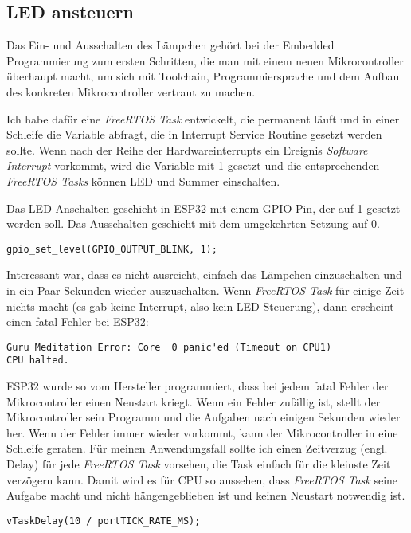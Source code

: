 \subsection{LED ansteuern}
\label{sec:main:led}
Das Ein- und Ausschalten des Lämpchen gehört bei der Embedded Programmierung zum ersten Schritten, die man mit einem neuen Mikrocontroller überhaupt macht, um sich mit Toolchain, Programmiersprache und dem Aufbau des konkreten Mikrocontroller vertraut zu machen. 

Ich habe dafür eine \textit{FreeRTOS Task} entwickelt, die permanent läuft und in einer Schleife die Variable abfragt, die in Interrupt Service Routine gesetzt werden sollte. Wenn nach der Reihe der Hardwareinterrupts ein Ereignis \textit{Software Interrupt} vorkommt, wird die Variable mit 1 gesetzt und die entsprechenden \textit{FreeRTOS Tasks} können LED und Summer einschalten. 

Das LED Anschalten geschieht in ESP32 mit einem GPIO Pin, der auf 1 gesetzt werden soll. Das Ausschalten geschieht mit dem umgekehrten Setzung auf 0. 
\begin{lstlisting}
gpio_set_level(GPIO_OUTPUT_BLINK, 1);
\end{lstlisting}
Interessant war, dass es nicht ausreicht, einfach das Lämpchen einzuschalten und in ein Paar Sekunden wieder auszuschalten. Wenn \textit{FreeRTOS Task} für einige Zeit nichts macht (es gab keine Interrupt, also kein LED Steuerung), dann erscheint einen fatal Fehler bei ESP32:
\begin{lstlisting}
Guru Meditation Error: Core  0 panic'ed (Timeout on CPU1)
CPU halted.
\end{lstlisting}
ESP32 wurde so vom Hersteller programmiert, dass bei jedem fatal Fehler der Mikrocontroller einen Neustart kriegt. Wenn ein Fehler zufällig ist, stellt der Mikrocontroller sein Programm und die Aufgaben nach einigen Sekunden wieder her. Wenn der Fehler immer wieder vorkommt, kann der Mikrocontroller in eine Schleife geraten. Für meinen Anwendungsfall sollte ich einen Zeitverzug (engl. Delay) für jede \textit{FreeRTOS Task} vorsehen, die Task einfach für die kleinste Zeit verzögern kann. Damit wird es für CPU so aussehen, dass \textit{FreeRTOS Task} seine Aufgabe macht und nicht hängengeblieben ist und keinen Neustart notwendig ist.
 \begin{lstlisting}
vTaskDelay(10 / portTICK_RATE_MS);
 \end{lstlisting}
